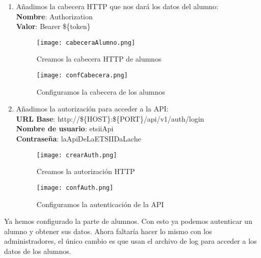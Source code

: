 \begin{enumerate}
	\item Añadimos la cabecera HTTP que nos dará los datos del alumno:\\
	\textbf{Nombre}: Authorization\\
	\textbf{Valor}: Bearer \$\{token\}
	\begin{figure}[H]
		\centering
		\texttt{[image: cabeceraAlumno.png]}
		\caption{Creamos la cabecera HTTP de alumnos}
	\end{figure}
	\begin{figure}[H]
		\centering
		\texttt{[image: confCabecera.png]}
		\caption{Configuramos la cabecera de los alumnos}
	\end{figure}

	\item Añadimos la autorización para acceder a la API:\\
	\textbf{URL Base}: http://\$\{HOST\}:\$\{PORT\}/api/v1/auth/login \\
	\textbf{Nombre de usuario}: etsiiApi \\
	\textbf{Contraseña}: laApiDeLaETSIIDaLache
	\begin{figure}[H]
		\centering
		\texttt{[image: crearAuth.png]}
		\caption{Creamos la autorización HTTP}
	\end{figure}
\begin{figure}[H]
	\centering
	\texttt{[image: confAuth.png]}
	\caption{Configuramos la autenticación de la API}
\end{figure}
\end{enumerate}

Ya hemos configurado la parte de alumnos. Con esto ya podemos autenticar un alumno y obtener sus datos. Ahora faltaría hacer lo mismo con los administradores, el único cambio es que usan el archivo de log para acceder a los datos de los alumnos.

